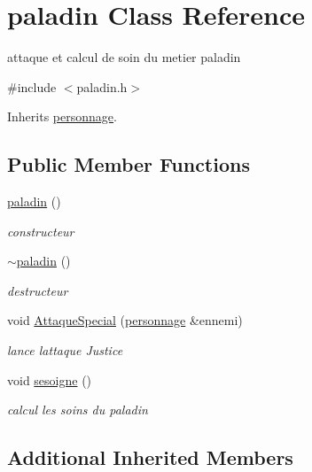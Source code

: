 \hypertarget{classpaladin}{}\section{paladin Class Reference}
\label{classpaladin}


attaque et calcul de soin du metier paladin  




{\ttfamily \#include $<$paladin.\+h$>$}



Inherits \mbox{\hyperlink{classpersonnage}{personnage}}.

\subsection*{Public Member Functions}
\begin{DoxyCompactItemize}
\item 
\mbox{\hyperlink{classpaladin_ab9bcad664a521ddc81e4acc6552edfd2}{paladin}} ()
\begin{DoxyCompactList}\small\item\em constructeur \end{DoxyCompactList}\item 
\mbox{\hyperlink{classpaladin_a2d16bf83b24776ac60bc662f5c7593c1}{$\sim$paladin}} ()
\begin{DoxyCompactList}\small\item\em destructeur \end{DoxyCompactList}\item 
void \mbox{\hyperlink{classpaladin_aae8d62c6e7c30ad1d4fbc9f147161d74}{Attaque\+Special}} (\mbox{\hyperlink{classpersonnage}{personnage}} \&ennemi)
\begin{DoxyCompactList}\small\item\em lance l\textquotesingle{}attaque Justice \end{DoxyCompactList}\item 
void \mbox{\hyperlink{classpaladin_af97688ef9f2cc305e9e942818a3916d7}{sesoigne}} ()
\begin{DoxyCompactList}\small\item\em calcul les soins du paladin \end{DoxyCompactList}\end{DoxyCompactItemize}
\subsection*{Additional Inherited Members}


